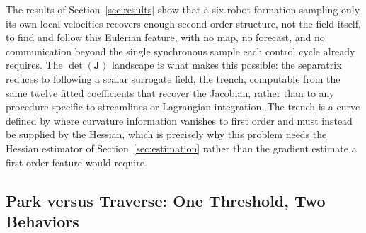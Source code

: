 \documentclass[lettersize,journal]{IEEEtran}
\begin{document}
The results of Section~\ref{sec:results} show that a six-robot formation
sampling only its own local velocities recovers enough second-order
structure, not the field itself, to find and follow this Eulerian
feature, with no map, no forecast, and no communication beyond the
single synchronous sample each control cycle already requires. The
$\det(\mathbf{J})$ landscape is what makes this possible: the separatrix
reduces to following a scalar surrogate field, the trench, computable
from the same twelve fitted coefficients that recover the Jacobian,
rather than to any procedure specific to streamlines or Lagrangian
integration. The trench is a curve defined by where curvature
information vanishes to first order and must instead be supplied by
the Hessian, which is precisely why this problem needs the Hessian
estimator of Section~\ref{sec:estimation} rather than the gradient
estimate a first-order feature would require.

\subsection{Park versus Traverse: One Threshold, Two Behaviors}
\label{sec:park_vs_traverse}
\end{document}
